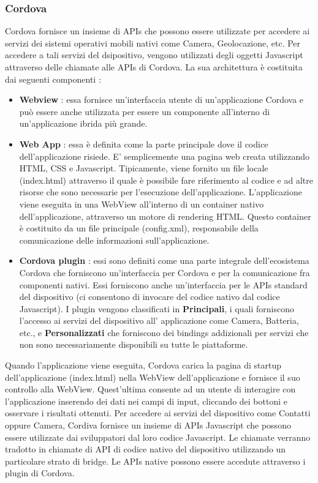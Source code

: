 \documentclass[12pt]{report}
\begin{document}
\subsubsection{Cordova}
Cordova fornisce un insieme di APIs che possono essere utilizzate per accedere ai servizi dei sistemi operativi mobili nativi come Camera, Geolocazione, etc. Per accedere a tali servizi del dsipositivo, vengono utilizzati degli oggetti Javascript attraverso delle chiamate alle APIs di Cordova. La sua architettura è costituita dai seguenti componenti :
\begin{itemize}
\item \textbf{Webview} : essa fornisce un'interfaccia utente di un'applicazione Cordova e può essere anche utilizzata per essere un componente all'interno di un'applicazione ibrida più grande.
\item \textbf{Web App} : essa è definita come la parte principale dove il codice dell'applicazione risiede. E' semplicemente una pagina web creata utilizzando HTML, CSS e Javascript. Tipicamente, viene fornito un file locale (index.html) attraverso il quale è possibile fare riferimento al codice e ad altre risorse che sono necessarie per l'esecuzione dell'applicazione. L'applicazione viene eseguita in una WebView all'interno di un container nativo dell'applicazione, attraverso un motore di rendering HTML. Questo container è costituito da un file principale (config.xml), responsabile della comunicazione delle informazioni sull'applicazione.
\item \textbf{Cordova plugin} : essi sono definiti come una parte integrale dell'ecosistema Cordova che forniscono un'interfaccia per Cordova e per la comunicazione fra componenti nativi. Essi forniscono anche un'interfaccia per le APIs standard del dispositivo (ci consentono di invocare del codice nativo dal codice Javascript). I plugin vengono classificati in \textbf{Principali}, i quali forniscono l'accesso ai servizi del dispositivo all' applicazione come Camera, Batteria, etc., e \textbf{Personalizzati} che forniscono dei bindings addizionali per servizi che non sono necessariamente disponibili su tutte le piattaforme.
\end{itemize}
Quando l'applicazione viene eseguita, Cordova carica la pagina di startup dell'applicazione (index.html) nella WebView dell'applicazione e fornisce il suo controllo alla WebView. Quest'ultima consente ad un utente di interagire con l'applicazione inserendo dei dati nei campi di input, cliccando dei bottoni e osservare i risultati ottenuti. Per accedere ai servizi del dispositivo come Contatti oppure Camera, Cordiva fornisce un insieme di APIs Javascript che possono essere utilizzate dai sviluppatori dal loro codice Javascript. Le chiamate verranno tradotto in chiamate di API di codice nativo del dispositivo utilizzando un particolare strato di bridge. Le APIs native possono essere accedute attraverso i plugin di Cordova.
\end{document}
